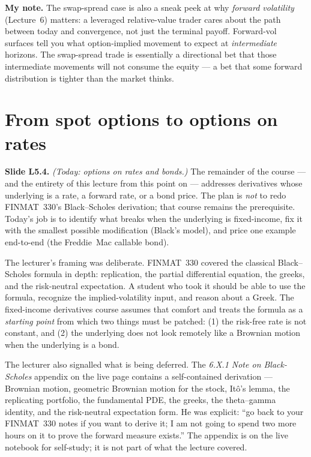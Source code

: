 \begin{checkpoint}
\textbf{My note.} The swap-spread case is also a sneak peek at why
\emph{forward volatility} (Lecture~6) matters: a leveraged
relative-value trader cares about the path between today and
convergence, not just the terminal payoff. Forward-vol surfaces tell
you what option-implied movement to expect at \emph{intermediate}
horizons. The swap-spread trade is essentially a directional bet that
those intermediate movements will not consume the equity --- a bet
that some forward distribution is tighter than the market thinks.
\end{checkpoint}

\section{From spot options to options on rates}\label{L5-sec:transition}

\begin{keyblock}
\textbf{Slide L5.4.} \emph{(Today: options on rates and bonds.)} The
remainder of the course --- and the entirety of this lecture from this
point on --- addresses derivatives whose underlying is a rate, a
forward rate, or a bond price. The plan is \emph{not} to redo
FINMAT~330's Black--Scholes derivation; that course remains the
prerequisite. Today's job is to identify what breaks when the
underlying is fixed-income, fix it with the smallest possible
modification (Black's model), and price one example end-to-end (the
Freddie~Mac callable bond).
\end{keyblock}

The lecturer's framing was deliberate. FINMAT~330 covered the
classical Black--Scholes formula in depth: replication, the partial
differential equation, the greeks, and the risk-neutral expectation. A
student who took it should be able to use the formula, recognize the
implied-volatility input, and reason about a Greek. The fixed-income
derivatives course assumes that comfort and treats the formula as a
\emph{starting point} from which two things must be patched: (1) the
risk-free rate is not constant, and (2) the underlying does not look
remotely like a Brownian motion when the underlying is a bond.

The lecturer also signalled what is being deferred. The \emph{6.X.1
Note on Black-Scholes} appendix on the live page contains a
self-contained derivation --- Brownian motion, geometric Brownian
motion for the stock, Itô's lemma, the replicating portfolio, the
fundamental PDE, the greeks, the theta--gamma identity, and the
risk-neutral expectation form. He was explicit: ``go back to your
FINMAT~330 notes if you want to derive it; I am not going to spend
two more hours on it to prove the forward measure exists.'' The
appendix is on the live notebook for self-study; it is not part of
what the lecture covered.

